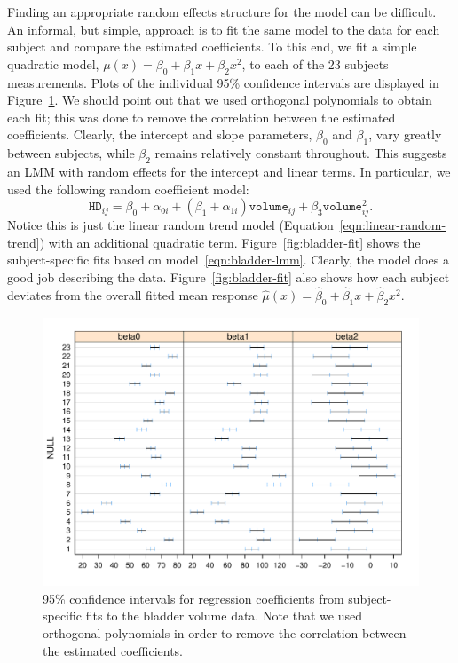 \documentclass[cmfont,usenames,dvipsnames,leqno]{afit-etd}\usepackage[]{graphicx}\usepackage[]{color}
\makeatletter
\def\maxwidth{ %
  \ifdim\Gin@nat@width>\linewidth
    \linewidth
  \else
    \Gin@nat@width
  \fi
}
\newenvironment{knitrout}{}{} %
\renewenvironment{knitrout}{\begin{singlespace}}{\end{singlespace}}
\newcommand{\wh}[1]{\ensuremath{\widehat{#1}}}
\makeatother
\begin{document}
Finding an appropriate random effects structure for the model can be difficult. An informal, but simple, approach is to fit the same model to the data for each subject and compare the estimated coefficients. To this end, we fit a simple quadratic model, $\mu(x) = \beta_0 + \beta_1 x + \beta_2 x^2$, to each of the 23 subjects measurements. Plots of the individual 95\% confidence intervals are displayed in Figure~\ref{fig:bladder-intervals}. We should point out that we used orthogonal polynomials to obtain each fit; this was done to remove the correlation between the estimated coefficients. Clearly, the intercept and slope parameters, $\beta_0$ and $\beta_1$, vary greatly between subjects, while $\beta_2$ remains relatively constant throughout. This suggests an LMM with random effects for the intercept and linear terms. In particular, we used the following random coefficient model:
\begin{equation}
\label{eqn:bladder-lmm}
  \texttt{HD}_{ij} = \beta_0+\alpha_{0i} + \left(\beta_1+\alpha_{1i}\right)\texttt{volume}_{ij} + \beta_3\texttt{volume}_{ij}^2.
\end{equation}
Notice this is just the linear random trend model (Equation~\eqref{eqn:linear-random-trend}) with an additional quadratic term. Figure~\ref{fig:bladder-fit} shows the subject-specific fits based on model~\eqref{eqn:bladder-lmm}. Clearly, the model does a good job describing the data. Figure~\ref{fig:bladder-fit} also shows how each subject deviates from the overall fitted mean response $\wh{\mu}\left(x\right) = \wh{\beta}_0 + \wh{\beta}_1 x + \wh{\beta}_2 x^2$.

\begin{knitrout}
\color{fgcolor}\begin{figure}[H]

\includegraphics[width=\maxwidth]{figure/bladder-intervals} \caption[95\% confidence intervals for the bladder volume example]{95\% confidence intervals for regression coefficients from subject-specific fits to the bladder volume data. Note that we used orthogonal polynomials in order to remove the correlation between the estimated coefficients.\label{fig:bladder-intervals}}
\end{figure}


\end{knitrout}
\end{document}

